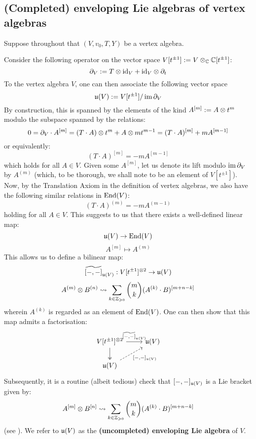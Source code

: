     \subsection{(Completed) enveloping Lie algebras of vertex algebras}
        Suppose throughout that $(V, v_0, T, Y)$ be a vertex algebra.
    
        Consider the following operator on the vector space $V[t^{\pm 1}] := V \tensor_{\bbC} \bbC[t^{\pm 1}]$:
            $$\del_V := T \tensor \id_V + \id_V \tensor \del_t$$
        To the vertex algebra $V$, one can then associate the following vector space
            $$\mathfrak{u}(V) := V[t^{\pm 1}]/\operatorname{im} \partial_V$$
        By construction, this is spanned by the elements of the kind $A^{[m]} := A \tensor t^m$ modulo the subspace spanned by the relations:
            $$0 = \del_V \cdot A^{[m]} = (T \cdot A) \tensor t^m + A \tensor m t^{m - 1} = (T \cdot A)^{[m]} + m A^{[m - 1]}$$
        or equivalently:
            $$(T \cdot A)^{[m]} = -m A^{[m - 1]}$$
        which holds for all $A \in V$. Given some $A^{[m]}$, let us denote its lift modulo $\operatorname{im} \partial_V$ by $A^{(m)}$ (which, to be thorough, we shall note to be an element of $V[t^{\pm 1}]$). Now, by the Translation Axiom in the definition of vertex algebras, we also have the following similar relations in $\mathrm{End}(V)$:
            $$(T \cdot A)^{(m)} = -m A^{(m - 1)}$$
        holding for all $A \in V$. This suggests to us that there exists a well-defined linear map:
            $$\mathfrak{u}(V) \to \mathrm{End}(V)$$
            $$A^{[m]} \mapsto A^{(m)}$$
        This allows us to define a bilinear map:
            $$\widetilde{[-, -]}_{\fraku(V)}: V[t^{\pm 1}]^{\tensor 2} \to \fraku(V)$$
            $$A^{(m)} \tensor B^{(n)} \mapsto \sum_{k \in \Z_{\geq 0}} \binom{m}{k} (A^{(k)} \cdot B)^{[m + n - k]}$$
        wherein $A^{(k)}$ is regarded as an element of $\mathrm{End}(V)$. One can then show that this map admits a factorisation:
            $$
                \begin{tikzcd}
                {V[t^{\pm 1}]^{\tensor 2}} & {\fraku(V)} \\
                {\fraku(V)}
                \arrow["{\widetilde{[-, -]}_{\fraku(V)}}", from=1-1, to=1-2]
                \arrow[two heads, from=1-1, to=2-1]
                \arrow["{[-, -]_{\fraku(V)}}"', dashed, from=2-1, to=1-2]
                \end{tikzcd}
            $$
        Subsequently, it is a routine (albeit tedious) check that $[-, -]_{\mathfrak{u}(V)}$ is a Lie bracket given by:
            $$A^{[m]} \tensor B^{[n]} \mapsto \sum_{k \in \Z_{\geq 0}} \binom{m}{k} (A^{(k)} \cdot B)^{[m + n - k]}$$
        (see \cite[Theorem 4.1.2]{frenkel_ben_zvi_vertex_algebras_and_algebraic_curves}). We refer to $\mathfrak{u}(V)$ as the \textbf{(uncompleted) enveloping Lie algebra} of $V$.

